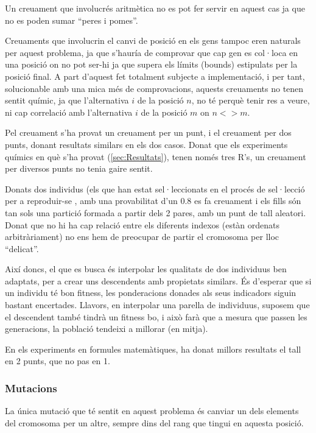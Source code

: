 \documentclass[titlepage,a4paper,12pt]{book}
\begin{document}
Un creuament que involucrés aritmètica no es pot fer servir en aquest cas ja que
no es poden sumar ``peres i pomes''.

Creuaments que involucrin el canvi de posició en els gens tampoc eren naturals
per aquest problema, ja que s'hauría de comprovar que cap gen es col·loca en una
posició on no pot ser-hi ja que supera els límits (bounds) estipulats per la
posició final.  A part d'aquest fet totalment subjecte a implementació, i per
tant, solucionable amb una mica més de comprovacions, aquests creuaments no
tenen sentit químic, ja que l'alternativa $i$ de la posició $n$, no té perquè
tenir res a veure, ni cap correlació amb l'alternativa $i$ de la posició $m$ on
$n <> m$.

Pel creuament s'ha provat un creuament per un punt, i el creuament per dos
punts, donant resultats similars en els dos casos.  Donat que els experiments
químics en què s'ha provat (\ref{sec:Resultats}), tenen només tres R's, un
creuament per diversos punts no tenia gaire sentit.

Donats dos individus (els que han estat sel·leccionats en el procés de
sel·lecció per a reproduir-se , amb una provabilitat d'un 0.8 es fa creuament i
els fills són tan sols una partició formada a partir dels 2 pares, amb un punt
de tall aleatori.  Donat que no hi ha cap relació entre els diferents indexos
(estàn ordenats arbitràriament) no ens hem de preocupar de partir el cromosoma
per lloc ``delicat''. 

Així doncs, el que es busca és interpolar les qualitats de dos individuus ben
adaptats, per a crear uns descendents amb propietats similars.  És d'esperar que
si un individu té bon fitness, les ponderacions donades als seus indicadors
siguin bastant encertades.  Llavors, en interpolar una parella de individuus,
suposem que el descendent també tindrà un fitness bo, i això farà que a mesura
que passen les generacions, la població tendeixi a millorar (en mitja).

En els experiments en formules matemàtiques, ha donat millors resultats el tall
en 2 punts, que no pas en 1.


\subsubsection{Mutacions} %
\label{ssub:Mutacions}

La única mutació que té sentit en aquest problema és canviar un dels elements
del cromosoma per un altre, sempre dins del rang que tingui en aquesta posició.
\end{document}

